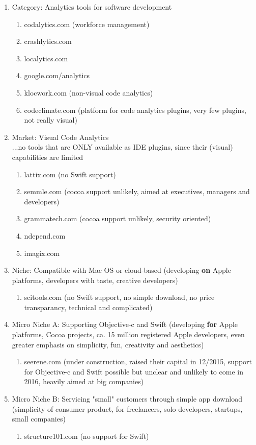 \documentclass{article}
\begin{document}
\begin{enumerate}
	\item Category: Analytics tools for software development
	\begin{enumerate}
		\item codalytics.com (workforce management)
		\item crashlytics.com
		\item localytics.com
		\item google.com/analytics
		\item klocwork.com (non-visual code analytics)
		\item codeclimate.com (platform for code analytics plugins, very few plugins, not really visual)
	\end{enumerate}
	\item Market: Visual Code Analytics\\...no tools that are ONLY available as IDE plugins, since their (visual) capabilities are limited
	\begin{enumerate}
		\item lattix.com (no Swift support)
		\item semmle.com (cocoa support unlikely, aimed at executives, managers and developers)
		\item grammatech.com (cocoa support unlikely, security oriented)
		\item ndepend.com
		\item imagix.com
	\end{enumerate}
	\item Niche: Compatible with Mac OS or cloud-based (developing \textbf{on} Apple platforms, developers with taste, creative developers)
	\begin{enumerate}
		\item scitools.com (no Swift support, no simple download, no price transparancy, technical and complicated)
	\end{enumerate}
	\item Micro Niche A: Supporting Objective-c and Swift (developing \textbf{for} Apple platforms, Cocoa projects, ca. 15 million registered Apple developers, even greater emphasis on simplicity, fun, creativity and aesthetics)
	\begin{enumerate}
		\item seerene.com (under construction, raised their capital in 12/2015, support for Objective-c and Swift possible but unclear and unlikely to come in 2016, heavily aimed at big companies)
	\end{enumerate}
	\item Micro Niche B: Servicing "small" customers through simple app download (simplicity of consumer product, for freelancers, solo developers, startups, small companies)
	\begin{enumerate}
		\item structure101.com (no support for Swift)
	\end{enumerate}
\end{enumerate}
\end{document}
